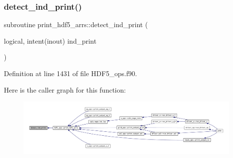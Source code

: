 \subsubsection{\texorpdfstring{detect\+\_\+ind\+\_\+print()}{detect\_ind\_print()}}
{\footnotesize\ttfamily subroutine print\+\_\+hdf5\+\_\+arrs\+::detect\+\_\+ind\+\_\+print (\begin{DoxyParamCaption}\item[{logical, intent(inout)}]{ind\+\_\+print }\end{DoxyParamCaption})}



Definition at line 1431 of file H\+D\+F5\+\_\+ops.\+f90.

Here is the caller graph for this function\+:
\nopagebreak
\begin{figure}[H]
\begin{center}
\leavevmode
\includegraphics[width=350pt]{HDF5__ops_8f90_a9ce89bbcdaf88002bfab4d531536c989_icgraph}
\end{center}
\end{figure}
